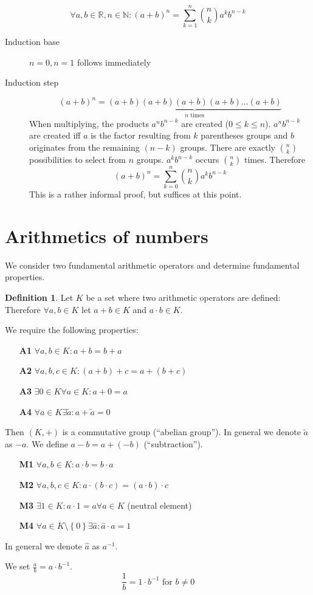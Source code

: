 \documentclass[a4paper,landscape,twocolumn]{article}
\theoremstyle{definition}
\newtheorem{defi}{Definition}
\newcommand\set[1]{\left\{#1\right\}}
\begin{document}
\[ \forall a, b \in \mathbb{R}, n \in \mathbb{N}: (a + b)^n = \sum_{k=1}^n \binom{n}{k} a^k b^{n-k}  \]
\begin{description}
  \item[Induction base] $n = 0, n = 1$ follows immediately
  \item[Induction step]
    \[ (a + b)^n = \underbrace{(a + b)(a + b)(a + b)(a + b)\dots(a + b)}_{n \text{ times}} \]
    When multiplying, the products $a^n b^{n-k}$ are created ($0 \leq k \leq n$).
    $a^n b^{n-k}$ are created iff $a$ is the factor resulting from $k$ parentheses groups and
    $b$ originates from the remaining $(n-k)$ groups.
    There are exactly $\binom{n}{k}$ possibilities to select from $n$ groups.
    $a^k b^{n-k}$ occurs $\binom nk$ times.
    Therefore
    \[ (a + b)^n = \sum_{k=0}^n \binom nk a^k b^{n-k} \]
    This is a rather informal proof, but suffices at this point.
\end{description}

\section{Arithmetics of numbers}
%
We consider two fundamental arithmetic operators and determine fundamental properties.

\begin{defi}
  Let $K$ be a set where two arithmetic operators are defined:
  Therefore $\forall a,b \in K$ let $a + b \in K$ and $a \cdot b \in K$.

  We require the following properties:
  \begin{itemize}
    \item[\textbf{A1}] $\forall a,b \in K: a + b = b + a$
    \item[\textbf{A2}] $\forall a,b,c \in K: (a + b) + c = a + (b + c)$
    \item[\textbf{A3}] $\exists 0 \in K \forall a \in K: a + 0 = a$
    \item[\textbf{A4}] $\forall a \in K \exists \tilde{a}: a + \tilde{a} = 0$
  \end{itemize}
  Then $(K, +)$ is a commutative group (\enquote{abelian group}).
  In general we denote $\tilde{a}$ as $-a$.
  We define $a - b = a + (-b)$ (\enquote{subtraction}).

  \begin{itemize}
    \item[\textbf{M1}] $\forall a,b \in K: a \cdot b = b \cdot a$
    \item[\textbf{M2}] $\forall a,b,c \in K: a \cdot (b \cdot c) = (a \cdot b) \cdot c$
    \item[\textbf{M3}] $\exists 1 \in K: a \cdot 1 = a \forall a \in K$ (neutral element)
    \item[\textbf{M4}] $\forall a \in K \setminus \set{0} \exists \hat a: \hat a \cdot a = 1$
  \end{itemize}
  In general we denote $\hat a$ as $a^{-1}$.

  We set $\frac ab = a \cdot b^{-1}$.
  \[ \frac{1}{b} = 1 \cdot b^{-1} \text{ for } b \neq 0 \]
\end{defi}
\end{document}
